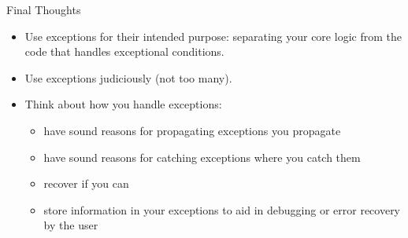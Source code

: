 \documentclass{beamer}
\begin{document}
\begin{frame}[fragile]{Final Thoughts}

\begin{itemize}
\item Use exceptions for their intended purpose: separating your core logic from the code that handles exceptional conditions.
\item Use exceptions judiciously (not too many).
\item Think about how you handle exceptions:
\begin{itemize}
\item have sound reasons for propagating exceptions you propagate
\item have sound reasons for catching exceptions where you catch them
\item recover if you can
\item store information in your exceptions to aid in debugging or error recovery by the user
\end{itemize}
\end{itemize}


\end{frame}







\end{document}
